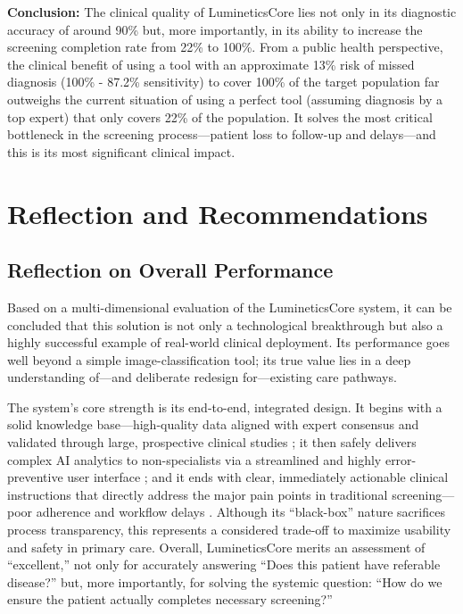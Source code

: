 \documentclass[sigplan,screen]{acmart}
\begin{document}
\textbf{Conclusion:} The clinical quality of LumineticsCore lies not only in its diagnostic accuracy of around 90\% but, more importantly, in its ability to increase the screening completion rate from 22\% to 100\%. From a public health perspective, the clinical benefit of using a tool with an approximate 13\% risk of missed diagnosis (100\% - 87.2\% sensitivity) to cover 100\% of the target population far outweighs the current situation of using a perfect tool (assuming diagnosis by a top expert) that only covers 22\% of the population. It solves the most critical bottleneck in the screening process---patient loss to follow-up and delays---and this is its most significant clinical impact.

\section{Reflection and Recommendations}

\subsection{Reflection on Overall Performance}

Based on a multi-dimensional evaluation of the LumineticsCore system, it can be concluded that this solution is not only a technological breakthrough but also a highly successful example of real-world clinical deployment. Its performance goes well beyond a simple image-classification tool; its true value lies in a deep understanding of---and deliberate redesign for---existing care pathways.

The system's core strength is its end-to-end, integrated design. It begins with a solid knowledge base---high-quality data aligned with expert consensus and validated through large, prospective clinical studies \cite{abramoff2018pivotal}; it then safely delivers complex AI analytics to non-specialists via a streamlined and highly error-preventive user interface \cite{fda2018denovo_summary}; and it ends with clear, immediately actionable clinical instructions that directly address the major pain points in traditional screening---poor adherence and workflow delays \cite{wolf2024autonomous}. Although its ``black-box'' nature sacrifices process transparency, this represents a considered trade-off to maximize usability and safety in primary care. Overall, LumineticsCore merits an assessment of ``excellent,'' not only for accurately answering ``Does this patient have referable disease?'' but, more importantly, for solving the systemic question: ``How do we ensure the patient actually completes necessary screening?''
\end{document}
